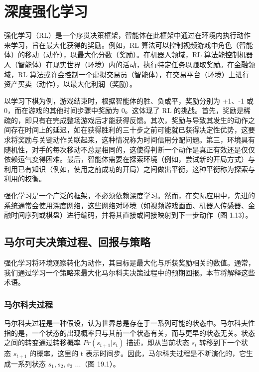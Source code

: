 \chapter{深度强化学习}

强化学习（RL）是一个序贯决策框架，智能体在此框架中通过在环境内执行动作来学习，旨在最大化获得的奖励。例如，RL 算法可以控制视频游戏中角色（智能体）的移动（动作），以最大化分数（奖励）。在机器人领域，RL 算法能控制机器人（智能体）在现实世界（环境）内的活动，执行特定任务以赚取奖励。在金融领域，RL 算法或许会控制一个虚拟交易员（智能体），在交易平台（环境）上进行资产买卖（动作），以最大化利润（奖励）。

以学习下棋为例，游戏结束时，根据智能体的胜、负或平，奖励分别为 +1、-1 或 0，而在游戏的其他时间步骤中奖励为 0。这体现了 RL 的挑战。首先，奖励是稀疏的，即只有在完成整场游戏后才能获得反馈。其次，奖励与导致其发生的动作之间存在时间上的延迟，如在获得胜利的三十步之前可能就已获得决定性优势，这要求将奖励与关键动作关联起来，这种情况称为时间信用分配问题。第三，环境具有随机性，对手的每次移动不总是相同的，这使得判断一个动作是真正有效还是仅仅依赖运气变得困难。最后，智能体需要在探索环境（例如，尝试新的开局方式）与利用已有知识（例如，使用之前成功的开局）之间做出平衡，这种平衡称为探索与利用的权衡。

强化学习是一个广泛的框架，不必须依赖深度学习。然而，在实际应用中，先进的系统通常会使用深度网络，这些网络对环境（如视频游戏画面、机器人传感器、金融时间序列或棋盘）进行编码，并将其直接或间接映射到下一步动作（图 1.13）。


\section{马尔可夫决策过程、回报与策略}
强化学习将环境观察转化为动作，其目标是最大化与所获奖励相关的数值。通常，我们通过学习一个策略来最大化马尔科夫决策过程中的预期回报。本节将解释这些术语。

\subsection{马尔科夫过程}
马尔科夫过程是一种假设，认为世界总是存在于一系列可能的状态中。马尔科夫性指的是，一个状态的出现概率只与其前一个状态有关，而与更早的状态无关。状态之间的转变通过转移概率 \(Pr(s_{t+1}|s_t)\) 描述，即从当前状态 \(s_t\) 转移到下一个状态 \(s_{t+1}\) 的概率，这里的 t 表示时间步。因此，马尔科夫过程是不断演化的，它生成一系列状态 \(s_1, s_2, s_3\) ...（图 19.1）。

